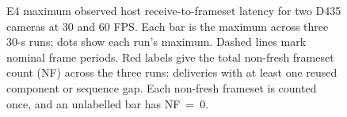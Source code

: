 \begin{figure}[!htb]
\centering
\resizebox{\textwidth}{!}{%
}
\caption{E4 maximum observed host receive-to-frameset latency for two D435
cameras at 30 and 60 FPS.  Each bar is the maximum across three 30-s runs;
dots show each run's maximum.  Dashed lines mark nominal frame periods.
Red labels give the total non-fresh frameset count (NF) across the three
runs: deliveries with at least one reused component or sequence gap.
Each non-fresh frameset is counted once, and an unlabelled bar has NF~=~0.}
\label{fig:main-matrix-max}
\end{figure}
